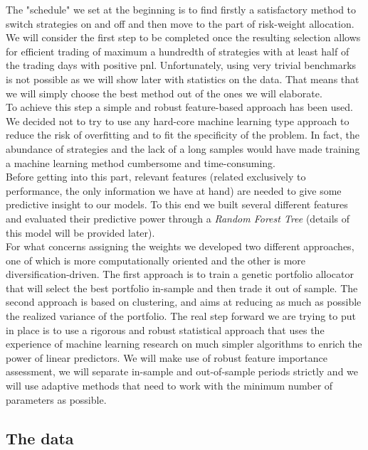 \documentclass[12pt]{article} %
\numberwithin{equation}{subsection}
\begin{document}
The "schedule" we set at the beginning is to find firstly a satisfactory method to switch strategies on and off and then move to the part of risk-weight allocation. We will consider the first step to be completed once the resulting selection allows for efficient trading of maximum a hundredth of strategies with at least half of the trading days with positive pnl. Unfortunately, using very trivial benchmarks is not possible as we will show later with statistics on the data. That means that we will simply choose the best method out of the ones we will elaborate.\\
To achieve this step a simple and robust feature-based approach has been used. We decided not to try to use any hard-core machine learning type approach to reduce the risk of overfitting and to fit the specificity of the problem. In fact, the abundance of strategies and the lack of a long samples would have made training a machine learning method cumbersome and time-consuming.\\
Before getting into this part, relevant features (related exclusively to performance, the only information we have at hand) are needed to give some predictive insight to our models. To this end we built several different features and evaluated their predictive power through a \textit{Random Forest Tree} (details of this model will be provided later).\\
For what concerns assigning the weights we developed two different approaches, one of which is more computationally oriented and the other is more diversification-driven. The first approach is to train a genetic portfolio allocator that will select the best portfolio in-sample and then trade it out of sample. The second approach is based on clustering, and aims at reducing as much as possible the realized variance of the portfolio. The real step forward we are trying to put in place is to use a rigorous and robust statistical approach that uses the experience of machine learning research on much simpler algorithms to enrich the power of linear predictors. We will make use of robust feature importance assessment, we will separate in-sample and out-of-sample periods strictly and we will use adaptive methods that need to work with the minimum number of parameters as possible.\\


\subsection{The data}
\end{document}
